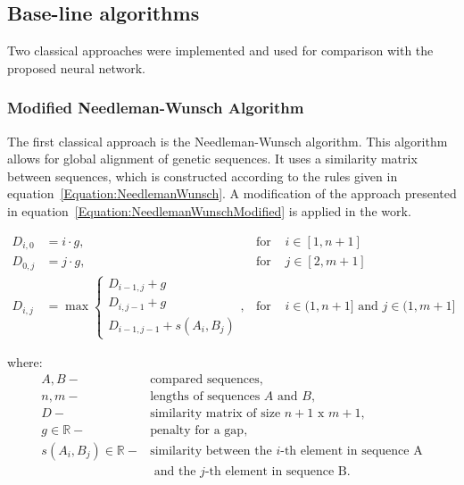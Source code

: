 \documentclass[pdflatex,sn-vancouver-num]{sn-jnl}%
\begin{document}
        \subsection{Base-line algorithms}


            Two classical approaches were implemented and used for comparison with the proposed neural network.

            \subsubsection{Modified Needleman-Wunsch Algorithm}
                The first classical approach is the Needleman-Wunsch algorithm. This algorithm allows for global alignment of genetic sequences. It uses a similarity matrix between sequences, which is constructed according to the rules given in equation~\eqref{Equation:NeedlemanWunsch}. A modification of the approach presented in equation~\eqref{Equation:NeedlemanWunschModified} is applied in the work.

                \begin{equation}
                    \begin{aligned}
                        D_{i,0} &= i \cdot g, & \text{for } & i \in [1, n + 1] \\
                        D_{0,j} &= j \cdot g, & \text{for } & j \in [2, m + 1] \\
                        D_{i,j} &= \max
                        \begin{cases}
                            D_{i - 1, j} + g \\
                            D_{i, j - 1} + g \\
                            D_{i - 1, j - 1} + s(A_i, B_j)
                        \end{cases}, & \text{for } & i \in (1, n + 1] \text{ and } j \in (1, m + 1]
                    \end{aligned}
                    \label{Equation:NeedlemanWunsch}
                \end{equation}

                where:
                \begin{align*}
                    A, B -& \text{compared sequences}, \\
                    n, m -& \text{lengths of sequences } A \text{ and } B, \\
                    D -& \text{similarity matrix of size } n + 1 \text{ x } m + 1, \\
                    g \in \mathbb{R} -& \text{penalty for a gap}, \\
                    s(A_i, B_j) \in \mathbb{R} -& \text{similarity between the } i\text{-th element in sequence A} \\ 
                                                & \text{ and the } j\text{-th element in sequence B}.
                \end{align*}
\end{document}

